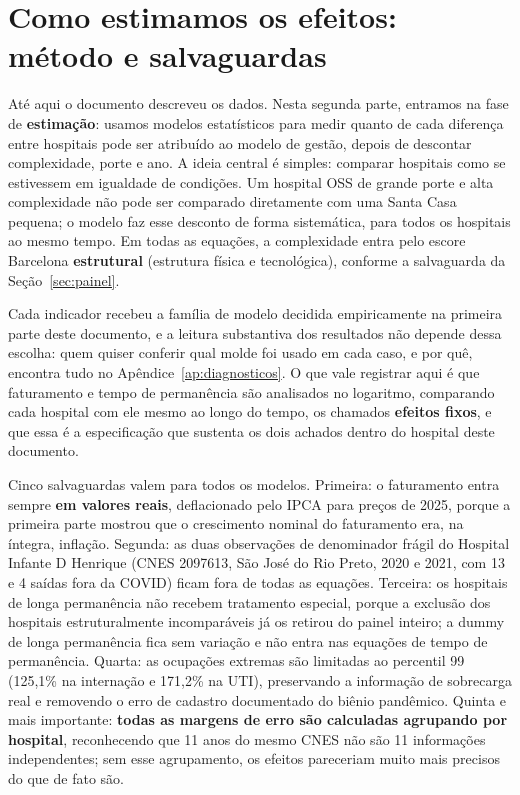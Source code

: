 \section{Como estimamos os efeitos: método e salvaguardas}
\label{sec:estrategia}

Até aqui o documento descreveu os dados. Nesta segunda parte, entramos
na fase de \textbf{estimação}: usamos modelos estatísticos para medir
quanto de cada diferença entre hospitais pode ser atribuído ao modelo
de gestão, depois de descontar complexidade, porte e ano. A ideia
central é simples: comparar hospitais como se estivessem em igualdade
de condições. Um hospital OSS de grande porte e alta complexidade não
pode ser comparado diretamente com uma Santa Casa pequena; o modelo faz
esse desconto de forma sistemática, para todos os hospitais ao mesmo
tempo. Em todas as equações, a complexidade entra pelo escore Barcelona
\textbf{estrutural} (estrutura física e tecnológica), conforme a
salvaguarda da Seção~\ref{sec:painel}.

Cada indicador recebeu a família de modelo decidida empiricamente na
primeira parte deste documento, e a leitura substantiva dos resultados
não depende dessa escolha: quem quiser conferir qual molde foi usado em
cada caso, e por quê, encontra tudo no
Apêndice~\ref{ap:diagnosticos}. O que vale registrar aqui é que
faturamento e tempo de permanência são analisados no logaritmo,
comparando cada hospital com ele mesmo ao longo do tempo, os
chamados \textbf{efeitos fixos}, e que essa é a especificação que
sustenta os dois achados dentro do hospital deste documento.

Cinco salvaguardas valem para todos os modelos. Primeira: o faturamento entra
sempre \textbf{em valores reais}, deflacionado pelo IPCA para preços de
2025, porque a primeira parte mostrou que o crescimento nominal do
faturamento era, na íntegra, inflação. Segunda: as duas observações de
denominador frágil do Hospital Infante D Henrique (CNES 2097613, São
José do Rio Preto, 2020 e 2021, com 13 e 4 saídas fora da COVID) ficam
fora de todas as equações. Terceira: os hospitais de longa permanência
não recebem tratamento especial, porque a exclusão dos hospitais
estruturalmente incomparáveis já os retirou do painel inteiro; a dummy
de longa permanência fica sem variação e não entra nas equações de
tempo de permanência. Quarta: as
ocupações extremas são limitadas ao percentil 99 (125,1\% na internação
e 171,2\% na UTI), preservando a informação de sobrecarga real e
removendo o erro de cadastro documentado do biênio pandêmico. Quinta e
mais importante: \textbf{todas as margens de erro são calculadas
agrupando por hospital}, reconhecendo que 11 anos do mesmo CNES não são
11 informações independentes; sem esse agrupamento, os efeitos
pareceriam muito mais precisos do que de fato são.

